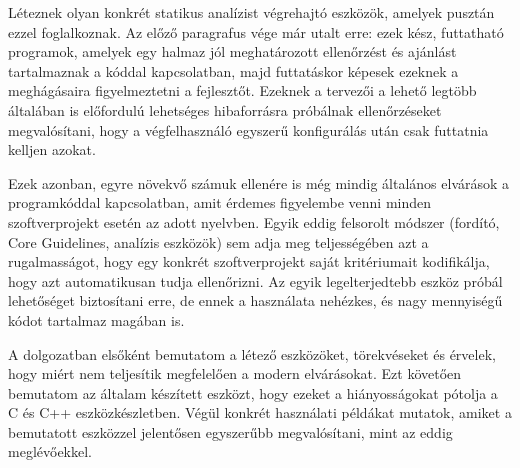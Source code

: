 Léteznek olyan konkrét statikus analízist végrehajtó eszközök, amelyek pusztán ezzel foglalkoznak.
Az előző paragrafus vége már utalt erre: ezek kész, futtatható programok, amelyek egy halmaz jól meghatározott ellenőrzést és ajánlást tartalmaznak a kóddal kapcsolatban, majd futtatáskor képesek ezeknek a meghágásaira figyelmeztetni a fejlesztőt.
Ezeknek a tervezői a lehető legtöbb általában is előfordulú lehetséges hibaforrásra próbálnak ellenőrzéseket megvalósítani, hogy a végfelhasználó egyszerű konfigurálás után csak futtatnia kelljen azokat.

Ezek azonban, egyre növekvő számuk ellenére is még mindig általános elvárások a programkóddal kapcsolatban, amit érdemes figyelembe venni minden szoftverprojekt esetén az adott nyelvben.
Egyik eddig felsorolt módszer (fordító, Core Guidelines, analízis eszközök) sem adja meg teljességében azt a rugalmasságot, hogy egy konkrét szoftverprojekt saját kritériumait kodifikálja, hogy azt automatikusan tudja ellenőrizni.
Az egyik legelterjedtebb eszköz próbál lehetőséget biztosítani erre, de ennek a használata nehézkes, és nagy mennyiségű kódot tartalmaz magában is.

A dolgozatban elsőként bemutatom a létező eszközöket, törekvéseket és érvelek, hogy miért nem teljesítik megfelelően a modern elvárásokat.
Ezt követően bemutatom az általam készített eszközt, hogy ezeket a hiányosságokat pótolja a C és C++ eszközkészletben.
Végül konkrét használati példákat mutatok, amiket a bemutatott eszközzel jelentősen egyszerűbb megvalósítani, mint az eddig meglévőekkel.

